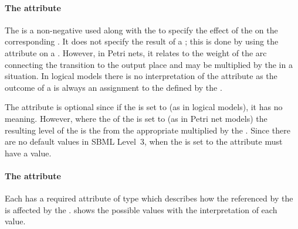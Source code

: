 \paragraph{The  attribute}
The  is a non-negative  used along with the  to specify the effect of the \Transition on the corresponding \QualitativeSpecies. It does not specify the result of a \Transition; this is done by using the  attribute on a \FunctionTerm. However, in Petri nets, it relates to the weight of the arc connecting the transition to the output place and may be multiplied by the  in a  situation. In logical models there is no interpretation of the  attribute as the outcome of a \Transition is always an assignment to the  defined by the \FunctionTerm. 

The  attribute is optional since if the  is set to  (as in logical models), it has no meaning. However, where the  of the \Output is set to  (as in Petri net models) the resulting level of the \QualitativeSpecies is the  from the appropriate \FunctionTerm multiplied by the . Since there are no default values in SBML Level~3, when the  is set to  the  attribute must have a value.

\paragraph{The  attribute}
Each \Output has a required attribute  of type  which describes how the \QualitativeSpecies referenced by the \Output is affected by the \Transition.  shows the possible values with the interpretation of each value.




